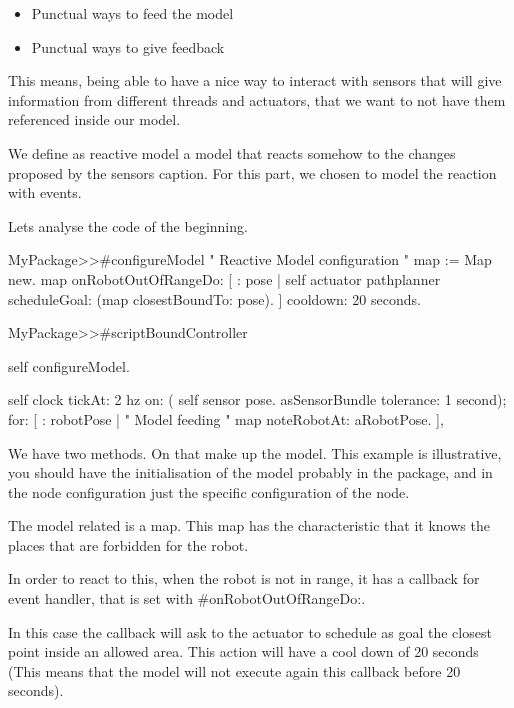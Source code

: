 \documentclass[a4paper,10pt,twoside]{book}
\begin{document}
						
						\begin{itemize}
							\item Punctual ways to feed the model
							\item Punctual ways to give feedback
						\end{itemize}
						
						This means, being able to have a nice way to interact with sensors that will give information from different threads and actuators, that we want to not have them referenced inside our model. 
						
						We define as reactive model a model that reacts somehow to the changes proposed by the sensors caption. 
						For this part, we chosen to model the reaction with events.			
					
					
						
						Lets analyse the code of the beginning.
						
							\begin{code}
			
			
			MyPackage>>#configureModel
				" Reactive Model configuration "
				map := Map new.
				map onRobotOutOfRangeDo: [ : pose | 
					self actuator pathplanner scheduleGoal: (map closestBoundTo: pose).
				] cooldown: 20 seconds.
		
		
			MyPackage>>#scriptBoundController
			
				self configureModel.
				
				self clock tickAt: 2 hz on: ({
					self sensor pose.
				} asSensorBundle tolerance: 1 second);
				  for: [
				 : robotPose |
					" Model feeding "
				 	 map noteRobotAt: aRobotPose.
				],
						
						
					\end{code}
					
					
					We have two methods. On that make up the model. This example is illustrative, you should have the initialisation of the model probably in the package, and in the node configuration just the specific configuration of the node. 
					
					The model related is a map. This map has the characteristic that it knows the places that are forbidden for the robot. 
						
					In order to react to this, when the robot is not in range, it has a callback for event handler, that is set with \#onRobotOutOfRangeDo:.
					
					In this case the callback will ask to the actuator to schedule as goal the closest point inside an allowed area. This action will have a cool down of 20 seconds (This means that the model will not execute again this callback before 20 seconds).
					
\end{document}
